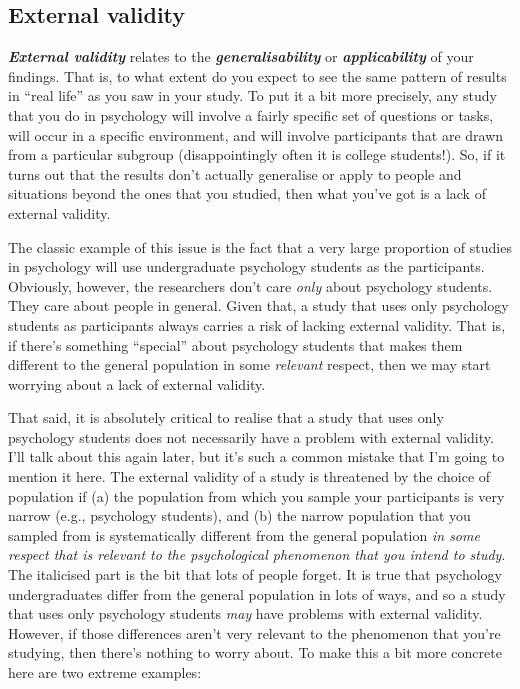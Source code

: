 \documentclass[
]{book}
\begin{document}
\hypertarget{external-validity}{%
\subsection{External validity}\label{external-validity}}

\textbf{\emph{External validity}} relates to the \textbf{\emph{generalisability}} or \textbf{\emph{applicability}} of your findings. That is, to what extent do you expect to see the same pattern of results in ``real life'' as you saw in your study. To put it a bit more precisely, any study that you do in psychology will involve a fairly specific set of questions or tasks, will occur in a specific environment, and will involve participants that are drawn from a particular subgroup (disappointingly often it is college students!). So, if it turns out that the results don't actually generalise or apply to people and situations beyond the ones that you studied, then what you've got is a lack of external validity.

The classic example of this issue is the fact that a very large proportion of studies in psychology will use undergraduate psychology students as the participants. Obviously, however, the researchers don't care \emph{only} about psychology students. They care about people in general. Given that, a study that uses only psychology students as participants always carries a risk of lacking external validity. That is, if there's something ``special'' about psychology students that makes them different to the general population in some \emph{relevant} respect, then we may start worrying about a lack of external validity.

That said, it is absolutely critical to realise that a study that uses only psychology students does not necessarily have a problem with external validity. I'll talk about this again later, but it's such a common mistake that I'm going to mention it here. The external validity of a study is threatened by the choice of population if (a) the population from which you sample your participants is very narrow (e.g., psychology students), and (b) the narrow population that you sampled from is systematically different from the general population \emph{in some respect that is relevant to the psychological phenomenon that you intend to study}. The italicised part is the bit that lots of people forget. It is true that psychology undergraduates differ from the general population in lots of ways, and so a study that uses only psychology students \emph{may} have problems with external validity. However, if those differences aren't very relevant to the phenomenon that you're studying, then there's nothing to worry about. To make this a bit more concrete here are two extreme examples:
\end{document}
